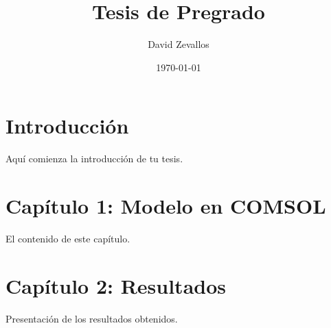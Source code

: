 \documentclass[12pt]{report}
\begin{document}
\title{Tesis de Pregrado}
\author{David Zevallos}
\date{\today}
\maketitle

\chapter{Introducción}
Aquí comienza la introducción de tu tesis.

\chapter{Capítulo 1: Modelo en COMSOL}
El contenido de este capítulo.

\chapter{Capítulo 2: Resultados}
Presentación de los resultados obtenidos.



\end{document}
